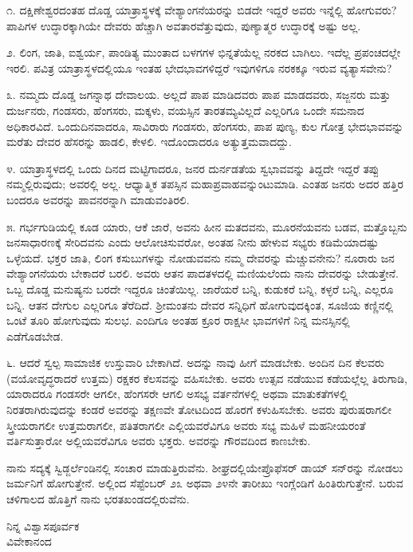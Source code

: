 ೧. ದಕ್ಷಿಣೇಶ್ವರದಂತಹ ದೊಡ್ಡ ಯಾತ್ರಾಸ್ಥಳಕ್ಕೆ ವೇಶ್ಯಾಂಗನೆಯರನ್ನು ಬಿಡದೇ ಇದ್ದರೆ ಅವರು ಇನ್ನೆಲ್ಲಿ ಹೋಗುವರು? ಪಾಪಿಗಳ ಉದ್ಧಾರಕ್ಕಾಗಿಯೇ ದೇವರು ಹೆಚ್ಚಾಗಿ ಅವತಾರವೆತ್ತುವುದು, ಪುಣ್ಯಾತ್ಮರ ಉದ್ಧಾರಕ್ಕೆ ಅಷ್ಟು ಅಲ್ಲ.

೨. ಲಿಂಗ, ಜಾತಿ, ಐಶ್ವರ್ಯ, ಪಾಂಡಿತ್ಯ ಮುಂತಾದ ಬಳಗಗಳ ಭಿನ್ನತೆಯೆಲ್ಲ ನರಕದ ಬಾಗಿಲು. ಇದೆಲ್ಲ ಪ್ರಪಂಚದಲ್ಲೇ ಇರಲಿ. ಪವಿತ್ರ ಯಾತ್ರಾಸ್ಥಳದಲ್ಲಿಯೂ ಇಂತಹ ಭೇದಭಾವಗಳಿದ್ದರೆ ಇವುಗಳಿಗೂ ನರಕಕ್ಕೂ ಇರುವ ವ್ಯತ್ಯಾಸವೇನು?

೩. ನಮ್ಮದು ದೊಡ್ಡ ಜಗನ್ನಾಥ ದೇವಾಲಯ. ಅಲ್ಲದೆ ಪಾಪ ಮಾಡಿದವರು ಪಾಪ ಮಾಡದವರು, ಸಜ್ಜನರು ಮತ್ತು ದುರ್ಜನರು, ಗಂಡಸರು, ಹೆಂಗಸರು, ಮಕ್ಕಳು, ವಯಸ್ಸಿನ ತಾರತಮ್ಯವಿಲ್ಲದೆ ಎಲ್ಲರಿಗೂ ಒಂದೇ ಸಮನಾದ ಅಧಿಕಾರವಿದೆ. ಒಂದು\break ದಿನವಾದರೂ, ಸಾವಿರಾರು ಗಂಡಸರು, ಹೆಂಗಸರು, ಪಾಪ ಪುಣ್ಯ, ಕುಲ ಗೋತ್ರ ಭೇದಭಾವವನ್ನು ಮರೆತು ದೇವರ ಹೆಸರನ್ನು ಹಾಡಲಿ, ಕೇಳಲಿ. ಇದೊಂದಾದರೂ ಅತ್ಯುತ್ತಮವಾದದ್ದು.

೪. ಯಾತ್ರಾಸ್ಥಳದಲ್ಲಿ ಒಂದು ದಿನದ ಮಟ್ಟಿಗಾದರೂ, ಜನರ ದುರ್ನಡತೆಯ ಸ್ವಭಾವವನ್ನು ತಿದ್ದದೇ ಇದ್ದರೆ ತಪ್ಪು ನಮ್ಮಲ್ಲಿರುವುದು; ಅವರಲ್ಲಿ ಅಲ್ಲ. ಆಧ್ಯಾತ್ಮಿಕ ತಪಸ್ಸಿನ ಮಹಾಪ್ರವಾಹವನ್ನುಂಟುಮಾಡಿ. ಎಂತಹ ಜನರು ಅದರ ಹತ್ತಿರ ಬಂದರೂ ಅವರನ್ನು ಪಾವನರನ್ನಾಗಿ ಮಾಡುವಂತಿರಲಿ.

೫. ಗರ್ಭಗುಡಿಯಲ್ಲಿ ಕೂಡ ಯಾರು, ಆಕೆ ಜಾರೆ, ಅವನು ಹೀನ ಮತದವನು, ಮೂರನೆಯವನು ಬಡವ, ಮತ್ತೊಬ್ಬನು ಜನಸಾಧಾರಣಕ್ಕೆ ಸೇರಿದವನು ಎಂದು ಆಲೋಚಿಸುವರೋ, ಅಂತಹ ನೀನು ಹೇಳುವ ಸಭ್ಯರು ಕಡಿಮೆಯಾದಷ್ಟು ಒಳ್ಳೆಯದೆ. ಭಕ್ತರ ಜಾತಿ, ಲಿಂಗ ಕಸುಬುಗಳನ್ನು ನೋಡುವವನು ನಮ್ಮ ದೇವರನ್ನು ಮೆಚ್ಚುವನೇನು? ನೂರಾರು ಜನ ವೇಶ್ಯಾಂಗನೆಯರು ಬೇಕಾದರೆ ಬರಲಿ. ಅವರು ಆತನ ಪಾದತಳದಲ್ಲಿ ಮಣಿಯಲೆಂದು ನಾನು ದೇವರನ್ನು ಬೇಡುತ್ತೇನೆ. ಒಬ್ಬ ದೊಡ್ಡ ಮನುಷ್ಯನು ಬರದೇ ಇದ್ದರೂ ಚಿಂತೆಯಿಲ್ಲ. ಜಾರೆಯರೆ ಬನ್ನಿ, ಕುಡುಕರೆ ಬನ್ನಿ, ಕಳ್ಳರೆ ಬನ್ನಿ, ಎಲ್ಲರೂ ಬನ್ನಿ. ಆತನ ದೇಗುಲ ಎಲ್ಲರಿಗೂ ತೆರೆದಿದೆ. ಶ‍್ರೀಮಂತನು ದೇವರ ಸನ್ನಿಧಿಗೆ ಹೋಗುವುದಕ್ಕಿಂತ, ಸೂಜಿಯ ಕಣ್ಣಿನಲ್ಲಿ ಒಂಟೆ ತೂರಿ ಹೋಗುವುದು ಸುಲಭ. ಎಂದಿಗೂ ಅಂತಹ ಕ್ರೂರ ರಾಕ್ಷಸೀ ಭಾವಗಳಿಗೆ ನಿನ್ನ ಮನಸ್ಸಿನಲ್ಲಿ ಎಡೆಗೊಡಬೇಡ.

೬. ಆದರೆ ಸ್ವಲ್ಪ ಸಾಮಾಜಿಕ ಉಸ್ತುವಾರಿ ಬೇಕಾಗಿದೆ. ಅದನ್ನು ನಾವು ಹೀಗೆ ಮಾಡಬೇಕು. ಅಂದಿನ ದಿನ ಕೆಲವರು (ವಯೋವೃದ್ಧರಾದರೆ ಉತ್ತಮ) ರಕ್ಷಕರ ಕೆಲಸವನ್ನು ವಹಿಸಬೇಕು. ಅವರು ಉತ್ಸವ ನಡೆಯುವ ಕಡೆಯಲ್ಲೆಲ್ಲ ತಿರುಗಾಡಿ, ಯಾರಾದರೂ ಗಂಡಸರೇ ಆಗಲೀ, ಹೆಂಗಸರೇ ಆಗಲಿ ಅಸಭ್ಯ ವರ್ತನೆಗಳಲ್ಲಿ ಅಥವಾ ಮಾತುಕತೆಗಳಲ್ಲಿ ನಿರತರಾಗಿರುವುದನ್ನು ಕಂಡರೆ ಅವರನ್ನು ತಕ್ಷಣವೇ ತೋಟದಿಂದ ಹೊರಗೆ ಕಳುಹಿಸಬೇಕು. ಅವರು ಪುರುಷರಾಗಲೀ ಸ್ತ್ರೀಯರಾಗಲೀ ಉತ್ತಮರಾಗಲೀ, ಪತಿತರಾಗಲೀ ಎಲ್ಲಿಯವರೆವಿಗೂ ಅವರು ಸಭ್ಯ ಮಹಿಳೆ ಮಹನೀಯರಂತೆ ವರ್ತಿಸುತ್ತಾರೋ ಅಲ್ಲಿಯವರೆವಿಗೂ ಅವರು ಭಕ್ತರು. ಅವರನ್ನು ಗೌರವದಿಂದ ಕಾಣಬೇಕು.

ನಾನು ಸದ್ಯಕ್ಕೆ ಸ್ವಿಡ್ಜರ್ಲೆಂಡಿನಲ್ಲಿ ಸಂಚಾರ ಮಾಡುತ್ತಿರುವೆನು. ಶೀಘ್ರದಲ್ಲಿಯೇ\break ಪ್ರೊಫೆಸರ್ ಡಾಯ್ ಸನ್‌ರನ್ನು ನೋಡಲು ಜರ್ಮನಿಗೆ ಹೋಗುತ್ತೇನೆ. ಅಲ್ಲಿಂದ ಸೆಪ್ಟೆಂಬರ್ ೨೩ ಅಥವಾ ೨೪ನೇ ತಾರೀಖು ಇಂಗ್ಲೆಂಡಿಗೆ ಹಿಂತಿರುಗುತ್ತೇನೆ. ಬರುವ ಚಳಿಗಾಲದ ಹೊತ್ತಿಗೆ ನಾನು ಭರತಖಂಡದಲ್ಲಿರುವೆನು.

{\flushright
ನಿನ್ನ ವಿಶ್ವಾಸಪೂರ್ವಕ\\ವಿವೇಕಾನಂದ\par}

